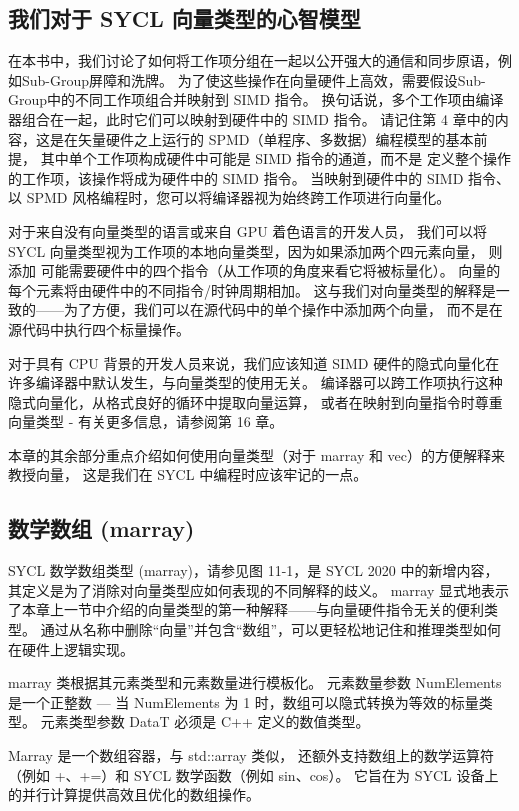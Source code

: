 \subsection{我们对于 SYCL 向量类型的心智模型}
在本书中，我们讨论了如何将工作项分组在一起以公开强大的通信和同步原语，例如Sub-Group屏障和洗牌。 
为了使这些操作在向量硬件上高效，需要假设Sub-Group中的不同工作项组合并映射到 SIMD 指令。 
换句话说，多个工作项由编译器组合在一起，此时它们可以映射到硬件中的 SIMD 指令。 
请记住第 4 章中的内容，这是在矢量硬件之上运行的 SPMD（单程序、多数据）编程模型的基本前提，
其中单个工作项构成硬件中可能是 SIMD 指令的通道，而不是 定义整个操作的工作项，该操作将成为硬件中的 SIMD 指令。 
当映射到硬件中的 SIMD 指令、以 SPMD 风格编程时，您可以将编译器视为始终跨工作项进行向量化。

对于来自没有向量类型的语言或来自 GPU 着色语言的开发人员，
我们可以将 SYCL 向量类型视为工作项的本地向量类型，因为如果添加两个四元素向量，
则添加 可能需要硬件中的四个指令（从工作项的角度来看它将被标量化）。 
向量的每个元素将由硬件中的不同指令/时钟周期相加。 
这与我们对向量类型的解释是一致的——为了方便，我们可以在源代码中的单个操作中添加两个向量，
而不是在源代码中执行四个标量操作。

对于具有 CPU 背景的开发人员来说，我们应该知道 SIMD 硬件的隐式向量化在许多编译器中默认发生，与向量类型的使用无关。 
编译器可以跨工作项执行这种隐式向量化，从格式良好的循环中提取向量运算，
或者在映射到向量指令时尊重向量类型 - 有关更多信息，请参阅第 16 章。

本章的其余部分重点介绍如何使用向量类型（对于 marray 和 vec）的方便解释来教授向量，
这是我们在 SYCL 中编程时应该牢记的一点。

\subsection{数学数组 (marray)}
SYCL 数学数组类型 (marray)，请参见图 11-1，是 SYCL 2020 中的新增内容，
其定义是为了消除对向量类型应如何表现的不同解释的歧义。 
marray 显式地表示了本章上一节中介绍的向量类型的第一种解释——与向量硬件指令无关的便利类型。 
通过从名称中删除“向量”并包含“数组”，可以更轻松地记住和推理类型如何在硬件上逻辑实现。

marray 类根据其元素类型和元素数量进行模板化。 
元素数量参数 NumElements 是一个正整数 — 当 NumElements 为 1 时，数组可以隐式转换为等效的标量类型。 
元素类型参数 DataT 必须是 C++ 定义的数值类型。

Marray 是一个数组容器，与 std::array 类似，
还额外支持数组上的数学运算符（例如 +、+=）和 SYCL 数学函数（例如 sin、cos）。 
它旨在为 SYCL 设备上的并行计算提供高效且优化的数组操作。

